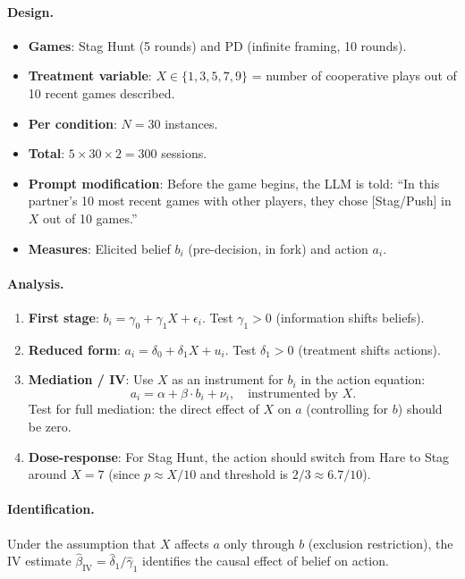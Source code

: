 \documentclass[12pt]{article}
\begin{document}
\paragraph{Design.}
\begin{itemize}[nosep]
    \item \textbf{Games}: Stag Hunt (5 rounds) and PD (infinite framing, 10 rounds).
    \item \textbf{Treatment variable}: $X \in \{1, 3, 5, 7, 9\}$ = number of cooperative plays out of 10 recent games described.
    \item \textbf{Per condition}: $N = 30$ instances.
    \item \textbf{Total}: $5 \times 30 \times 2 = 300$ sessions.
    \item \textbf{Prompt modification}: Before the game begins, the LLM is told: ``In this partner's 10 most recent games with other players, they chose [Stag/Push] in $X$ out of 10 games.''
    \item \textbf{Measures}: Elicited belief $b_i$ (pre-decision, in fork) and action $a_i$.
\end{itemize}

\paragraph{Analysis.}
\begin{enumerate}[nosep]
    \item \textbf{First stage}: $b_i = \gamma_0 + \gamma_1 X + \epsilon_i$. Test $\gamma_1 > 0$ (information shifts beliefs).
    \item \textbf{Reduced form}: $a_i = \delta_0 + \delta_1 X + u_i$. Test $\delta_1 > 0$ (treatment shifts actions).
    \item \textbf{Mediation / IV}: Use $X$ as an instrument for $b_i$ in the action equation:
    \begin{equation}
        a_i = \alpha + \beta \cdot b_i + \nu_i, \quad \text{instrumented by } X.
    \end{equation}
    Test for full mediation: the direct effect of $X$ on $a$ (controlling for $b$) should be zero.
    \item \textbf{Dose-response}: For Stag Hunt, the action should switch from Hare to Stag around $X = 7$ (since $p \approx X/10$ and threshold is $2/3 \approx 6.7/10$).
\end{enumerate}

\paragraph{Identification.}
Under the assumption that $X$ affects $a$ only through $b$ (exclusion restriction), the IV estimate $\hat\beta_{\text{IV}} = \hat\delta_1 / \hat\gamma_1$ identifies the causal effect of belief on action.
\end{document}
